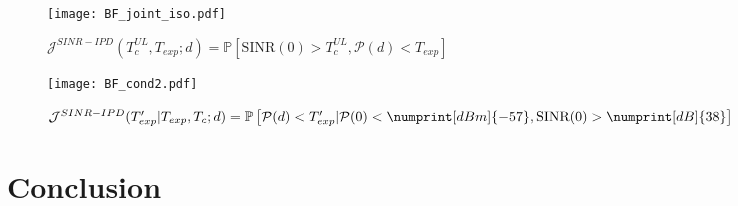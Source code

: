 \begin{figure}
    \centering
    \texttt{[image: BF\_joint\_iso.pdf]}
    \caption{$\mathcal{J}^{SINR-IPD}(T_{c}^{UL}, T_{exp};d) = \mathbb P\left[\text{SINR}(0) > T_{c}^{UL}, \mathcal{P}(d) < T_{exp}\right]$}
    \label{fig:BF_joint_iso}
\end{figure}

\begin{figure}
    \centering
    \texttt{[image: BF\_cond2.pdf]}
    \caption{$\mathcal{J}^{SINR-IPD}(T'_{exp} |T_{exp}, T_{c} ;d) = \mathbb P\left[\mathcal{P}(d) < T'_{exp}|\mathcal{P}(0) < \numprint[dBm]{-57}, \text{SINR}(0) > \numprint[dB]{38}\right]$}
    \label{fig:BF_cond2}
\end{figure}



\section{Conclusion}
\label{sec:conclusion}


